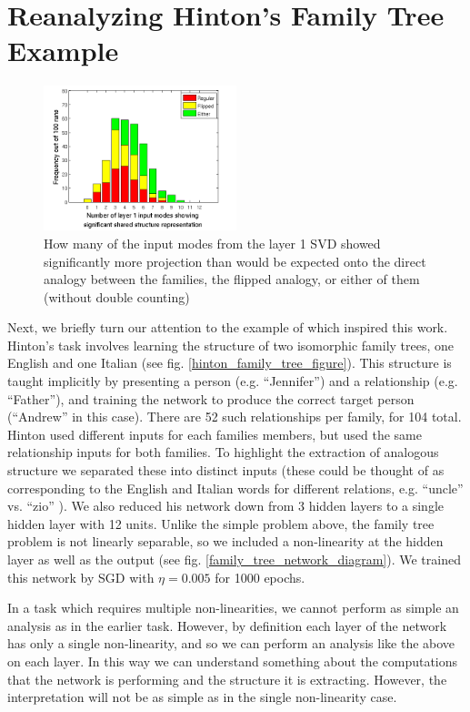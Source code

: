 \documentclass[10pt,letterpaper]{article}
\begin{document}
\section{Reanalyzing Hinton's Family Tree Example}
\begin{figure}
\centering
\includegraphics[width=0.5\textwidth]{figures/ft_input_mode_significance_hist.png}
\caption{How many of the input modes from the layer 1 SVD showed significantly more projection than would be expected onto the direct analogy between the families, the flipped analogy, or either of them (without double counting)}
\label{ft_input_mode_sig_hist}
\end{figure}
Next, we briefly turn our attention to the example of \citet{Hinton1986} which inspired this work. Hinton's task involves learning the structure of two isomorphic family trees, one English and one Italian (see fig. \ref{hinton_family_tree_figure}). This structure is taught implicitly by presenting a person (e.g. ``Jennifer'') and a relationship (e.g. ``Father''), and training the network to produce the correct target person (``Andrew'' in this case). There are 52 such relationships per family, for 104 total. Hinton used different inputs for each families members, but used the same relationship inputs for both families. To highlight the extraction of analogous structure we separated these into distinct inputs (these could be thought of as corresponding to the English and Italian words for different relations, e.g. ``uncle'' vs. ``zio'' ). We also reduced his network down from 3 hidden layers to a single hidden layer with 12 units. Unlike the simple problem above, the family tree problem is not linearly separable, so we included a non-linearity at the hidden layer as well as the output (see fig. \ref{family_tree_network_diagram}). We trained this network by SGD with \(\eta = 0.005\) for 1000 epochs. \par 
In a task which requires multiple non-linearities, we cannot perform as simple an analysis as in the earlier task. However, by definition each layer of the network has only a single non-linearity, and so we can perform an analysis like the above on each layer. In this way we can understand something about the computations that the network is performing and the structure it is extracting. However, the interpretation will not be as simple as in the single non-linearity case. \par
\end{document}
